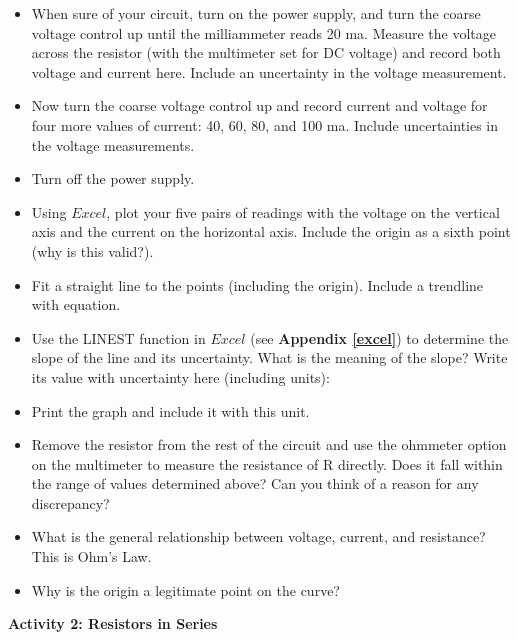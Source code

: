 \begin{itemize}
\item When sure of your circuit, turn on the power supply, and turn the coarse 
voltage control up until the milliammeter reads 20 ma. Measure the voltage 
across the resistor (with the multimeter set for DC voltage) and record both voltage and current here. Include an uncertainty in the voltage measurement.
\vspace{10mm}


\item Now turn the coarse voltage control up and record current and voltage 
for four more values of current: 40, 60, 80, and 100 ma. Include uncertainties
 in the voltage measurements.
\vspace{30mm}

\item Turn off the power supply.

\item Using $Excel$, plot your five pairs of readings with the voltage on the 
vertical axis and the current on the horizontal axis. Include the origin as a 
sixth point (why is this valid?).
\vspace{6mm}
\item Fit a straight line to the points (including the origin).
Include a trendline with equation.
\item Use the LINEST function in $Excel$ (see \textbf{Appendix \ref{excel}}) to 
determine the slope of the line and its uncertainty.  What is the meaning 
of the slope? Write its value with uncertainty here (including units):
\vspace{20mm}

\item Print the graph and include it with this unit.

\item Remove the resistor from the rest of the circuit and use the ohmmeter
option on the multimeter to measure the resistance of R directly.
Does it fall within the range of values determined above? Can you think of 
a reason for any discrepancy?
\vspace{20mm}

\item What is the general relationship between voltage, current, and resistance?
This is Ohm's Law.\vspace{15mm}

\item Why is the origin a legitimate point on the curve?\vspace{15mm}

\end{itemize}
\textbf{Activity 2: Resistors in Series}

